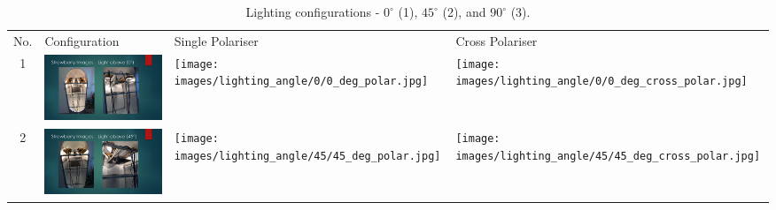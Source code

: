 \documentclass[fleqn,twoside,12pt]{report}
\begin{document}
\begin{table}[h]

	\caption{Lighting configurations - $0^{\circ}$ (1), $45^{\circ}$ (2), and $90^{\circ}$ (3).}
	\label{tab:lighting_orientation}
	\begin{tabular}{c*3{I}}
		\centering
		No. & Configuration & Single Polariser & Cross Polariser \\
		
		1 &
		\includegraphics[width=\linewidth]{images/lighting_angle/0/0_degrees_setup.pdf} & \texttt{[image: images/lighting\_angle/0/0\_deg\_polar.jpg]} & \texttt{[image: images/lighting\_angle/0/0\_deg\_cross\_polar.jpg]} \\
		
		2 &
		\includegraphics[width=\linewidth]{images/lighting_angle/45/45_degrees_setup.pdf} & \texttt{[image: images/lighting\_angle/45/45\_deg\_polar.jpg]} & \texttt{[image: images/lighting\_angle/45/45\_deg\_cross\_polar.jpg]} \\
		

\end{tabular}
\end{table}
\end{document}
